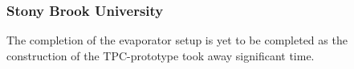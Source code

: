 \subsubsection{Stony Brook University} 
The completion of the evaporator setup is yet to be completed as the construction of the TPC-prototype took away significant time.